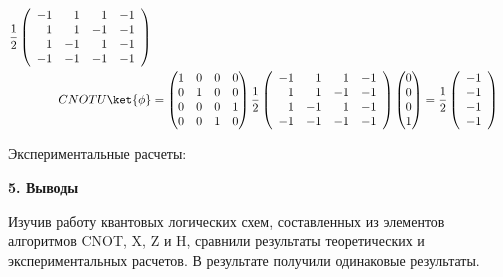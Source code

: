 \documentclass{article}
\begin{document}
\begin{align}
  \frac{1}{2} \begin{pmatrix}\begin{array}{rrrr} -1 & 1 & 1 & -1 \\ 1 & 1 & -1 &
  -1 \\ 1 & -1 & 1 & -1 \\ -1 & -1 & -1 & -1 \\ \end{array}\end{pmatrix}
  \\
  CNOTU\ket{\phi} &= \begin{pmatrix} 1 & 0 & 0 & 0 \\ 0 & 1 & 0 & 0 \\ 0 & 0 &
  0 & 1 \\ 0 & 0 & 1 & 0 \end{pmatrix}\frac{1}{2}
\begin{pmatrix}\begin{array}{rrrr} -1 & 1 & 1 & -1 \\ 1 & 1 & -1 & -1 \\ 1 & -1
                                      & 1 & -1 \\ -1 & -1 & -1 & -1
\end{array}\end{pmatrix} \begin{pmatrix} 0 \\ 0 \\ 0 \\ 1 \end{pmatrix} =
\frac{1}{2} \begin{pmatrix}\begin{array}{r} -1 \\ -1 \\ -1 \\ -1
\end{array}\end{pmatrix}
\end{align}

Экспериментальные расчеты:

\begin{figure}[H]
\end{figure}

\textbf{\large 5. Выводы}

Изучив работу квантовых логических схем, составленных из элементов алгоритмов
CNOT, X, Z и H, сравнили результаты теоретических и экспериментальных расчетов.
В результате получили одинаковые результаты.
\end{document}
